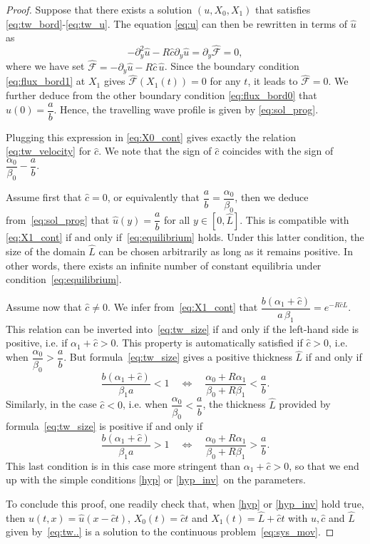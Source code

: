 \documentclass{amsart}
\newcommand\Flux{\mathcal{F}}
\renewcommand\d[1]{\partial_{#1}}
\begin{document}
	\begin{proof}
		Suppose that there exists a solution $(u, X_0, X_1)$ that satisfies \eqref{eq:tw_bord}-\eqref{eq:tw_u}. 		The equation \eqref{eq:u} can then be rewritten in terms of $\hat{u}$ as
		\begin{equation*} 
			- \d{y}^2 \hat{u} - R\hat{c} \d{y} \hat{u}=\d{y}\hat{\Flux} = 0, 
		\end{equation*}
		where we have set $\hat{\Flux} = - \d{y}\hat{u} - R\hat{c}\,\hat{u}$.
		Since the boundary condition \eqref{eq:flux_bord1} at $X_1$ gives $\hat{\Flux}(X_1(t)) = 0$ for any $t$, it leads to $\hat{\Flux} = 0$.
		We further deduce from the other boundary condition \eqref{eq:flux_bord0} that 
\(
			\hat{u}(0)=\dfrac{a}{b}.
\)
		Hence, the travelling wave profile is given by \eqref{eq:sol_prog}. 
		
		Plugging this expression in \eqref{eq:X0_cont} gives exactly the relation \eqref{eq:tw_velocity} for $\hat{c}$. We note that the sign of $\hat{c}$ coincides with the sign of $ \dfrac{\alpha_0}{\beta_0}-\dfrac{a}{b}$.
		
		Assume first that $\hat{c} = 0$, or equivalently that 
		$\dfrac{a}b = \dfrac{\alpha_0}{\beta_0}$, then we deduce from~\eqref{eq:sol_prog} that $\hat{u}(y)= \dfrac{a}{b}$ for all $y \in [0,\hat L]$. This is compatible with 
		 \eqref{eq:X1_cont} if and only if~\eqref{eq:equilibrium} holds.
		 Under this latter condition, the size of the domain $\hat{L}$ can be chosen arbitrarily as long as it remains positive. 
		 In other words, there exists an infinite number of constant equilibria under condition~\eqref{eq:equilibrium}. 

		Assume now that $\hat{c} \neq 0$. 
		We infer from~\eqref{eq:X1_cont} that 
		\(
		\dfrac{b(\alpha_1 + \hat c)}{a \, \beta_1} = e^{- R \hat c \hat L}. 
		\)
		This relation can be inverted into~\eqref{eq:tw_size} if and only if the left-hand side is positive, i.e. if $\alpha_1 + \hat c>0$. 
		This property is automatically satisfied if $\hat c>0$, i.e. when $\dfrac{\alpha_0}{\beta_0} > \dfrac{a}{b}$. But formula~\eqref{eq:tw_size} gives a positive thickness $\hat L$ if and only if 
		\[
		\frac{b(\alpha_1 + \hat c)}{\beta_1 a} < 1 \quad \Leftrightarrow \quad \frac{\alpha_0 + R \alpha_1}{\beta_0 + R \beta_1} < \frac{a}{b}.
		\]
		Similarly, in the case $\hat c<0$, i.e. when $\dfrac{\alpha_0}{\beta_0} < \dfrac{a}{b}$, the thickness $\hat L$ provided 
		by formula~\eqref{eq:tw_size} is positive if and only if 
		\[
		\frac{b(\alpha_1 + \hat c)}{\beta_1 a} > 1 \quad \Leftrightarrow \quad \frac{\alpha_0 + R \alpha_1}{\beta_0 + R \beta_1} > \frac{a}{b}.
		\]
		This last condition is in this case more stringent than $\alpha_1 + \hat c>0$, so that we end up with the simple conditions \eqref{hyp} or \eqref{hyp_inv} on the parameters. 

		To conclude this proof, one readily check that, when \eqref{hyp} or \eqref{hyp_inv} hold true, then $u(t,x) = \hat u(x - \hat c t)$, $X_0(t)= \hat c t $ 
		and $X_1(t) = \hat L + \hat c t$ with $\hat u, \hat c$ and $\hat L$  given by~\eqref{eq:tw..} is a solution to the continuous problem~\eqref{eq:sys_mov}. 
		\end{proof}
\end{document}
